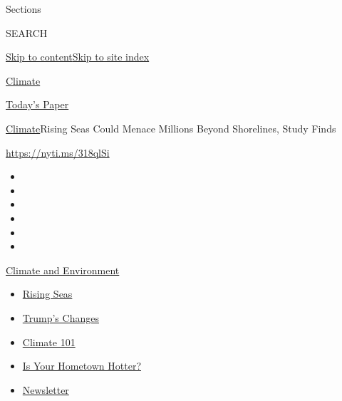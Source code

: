 Sections

SEARCH

\protect\hyperlink{site-content}{Skip to
content}\protect\hyperlink{site-index}{Skip to site index}

\href{https://www.nytimes3xbfgragh.onion/section/climate}{Climate}

\href{https://myaccount.nytimes3xbfgragh.onion/auth/login?response_type=cookie\&client_id=vi}{}

\href{https://www.nytimes3xbfgragh.onion/section/todayspaper}{Today's
Paper}

\href{/section/climate}{Climate}\textbar{}Rising Seas Could Menace
Millions Beyond Shorelines, Study Finds

\url{https://nyti.ms/318qlSi}

\begin{itemize}
\item
\item
\item
\item
\item
\item
\end{itemize}

\href{https://www.nytimes3xbfgragh.onion/section/climate?action=click\&pgtype=Article\&state=default\&region=TOP_BANNER\&context=storylines_menu}{Climate
and Environment}

\begin{itemize}
\tightlist
\item
  \href{https://www.nytimes3xbfgragh.onion/2020/07/30/climate/sea-level-inland-floods.html?action=click\&pgtype=Article\&state=default\&region=TOP_BANNER\&context=storylines_menu}{Rising
  Seas}
\item
  \href{https://www.nytimes3xbfgragh.onion/interactive/2020/climate/trump-environment-rollbacks.html?action=click\&pgtype=Article\&state=default\&region=TOP_BANNER\&context=storylines_menu}{Trump's
  Changes}
\item
  \href{https://www.nytimes3xbfgragh.onion/interactive/2020/04/19/climate/climate-crash-course-1.html?action=click\&pgtype=Article\&state=default\&region=TOP_BANNER\&context=storylines_menu}{Climate
  101}
\item
  \href{https://www.nytimes3xbfgragh.onion/interactive/2018/08/30/climate/how-much-hotter-is-your-hometown.html?action=click\&pgtype=Article\&state=default\&region=TOP_BANNER\&context=storylines_menu}{Is
  Your Hometown Hotter?}
\item
  \href{https://www.nytimes3xbfgragh.onion/newsletters/climate-change?action=click\&pgtype=Article\&state=default\&region=TOP_BANNER\&context=storylines_menu}{Newsletter}
\end{itemize}

